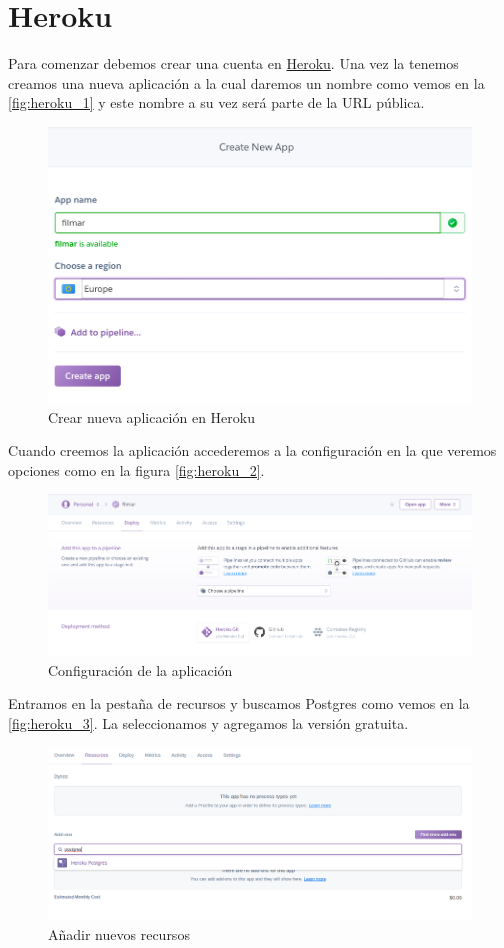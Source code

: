 \section{Heroku}
\label{app:heroku}
Para comenzar debemos crear una cuenta en \href{https://www.heroku.com/}{Heroku}.
Una vez la tenemos creamos una nueva aplicación a la
 cual daremos un nombre como vemos en la \autoref{fig:heroku_1} y este
 nombre a su vez será parte de la URL pública.
\begin{figure}[H]
    \centering
    \includegraphics[width=6in]{figures/appendix-A/heroku_1.png}
    \caption{Crear nueva aplicación en Heroku}
    \label{fig:heroku_1}
\end{figure}
Cuando creemos la aplicación accederemos a la configuración en la que veremos
 opciones como en la figura \autoref{fig:heroku_2}.
\begin{figure}[H]
    \centering
    \includegraphics[width=6in]{figures/appendix-A/heroku_2.png}
    \caption{Configuración de la aplicación}
    \label{fig:heroku_2}
\end{figure}
Entramos en la pestaña de recursos y buscamos Postgres como vemos en la
\autoref{fig:heroku_3}. La seleccionamos y agregamos la versión gratuita.
\begin{figure}[H]
    \centering
    \includegraphics[width=6in]{figures/appendix-A/heroku_3.png}
    \caption{Añadir nuevos recursos}
    \label{fig:heroku_3}
\end{figure}
